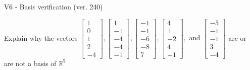 \begin{exercise}
  \begin{exerciseTitle}V6 - Basis verification (ver. 240)\end{exerciseTitle}
  \begin{exerciseStatement}
    Explain why the vectors \(\left[\begin{array}{r}
1 \\
0 \\
1 \\
2 \\
-4
\end{array}\right] , \left[\begin{array}{r}
1 \\
-1 \\
-4 \\
-4 \\
-1
\end{array}\right] , \left[\begin{array}{r}
-1 \\
-1 \\
-6 \\
-8 \\
7
\end{array}\right] , \left[\begin{array}{r}
4 \\
1 \\
-2 \\
4 \\
-1
\end{array}\right] , \text{ and } \left[\begin{array}{r}
-5 \\
-1 \\
-1 \\
3 \\
-4
\end{array}\right]\) are or are not a basis of \(\mathbb{R}^5\)	



\end{exerciseStatement}
\end{exercise}
